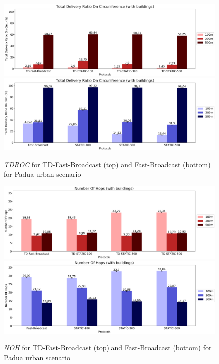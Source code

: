 		\begin{figure}[H]
			\centering
			\includegraphics[width=1.0\textwidth]{immagini/td-fb-pd/td-fb/tdroc}	
			\includegraphics[width=1.0\textwidth]{immagini/td-fb-pd/fb/tdroc}
			\caption{\textit{TDROC} for TD-Fast-Broadcast (top) and Fast-Broadcast (bottom) for Padua urban scenario}
			\label{fig:td-tdroc}
		\end{figure}
	
		\begin{figure}[H]
			\centering
			\includegraphics[width=1.0\textwidth]{immagini/td-fb-pd/td-fb/noh}	
			\includegraphics[width=1.0\textwidth]{immagini/td-fb-pd/fb/noh}
			\caption{\textit{NOH} for TD-Fast-Broadcast (top) and Fast-Broadcast (bottom) for Padua urban scenario}
			\label{fig:td-noh}
		\end{figure}
	
